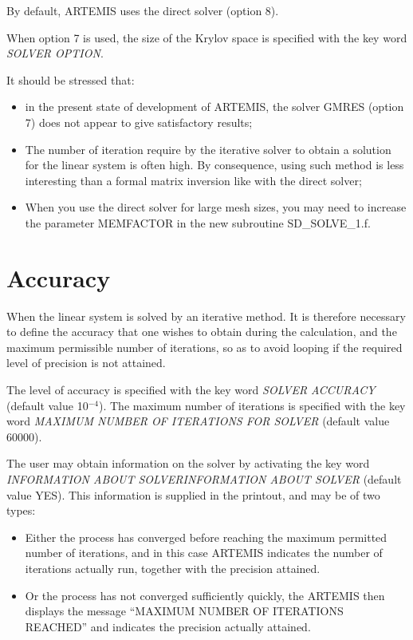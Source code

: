 By default, ARTEMIS uses the direct solver (option 8).

When option 7 is used, the size of the Krylov space is specified with the key word \textit{SOLVER OPTION}.

It should be stressed that:

\begin{itemize}
\item  in the present state of development of ARTEMIS, the solver GMRES (option
  7) does not appear to give satisfactory results;

\item  The number of iteration require by the iterative solver to obtain a
  solution for the linear system is often high. By consequence, using such
    method is less interesting than a formal matrix inversion like with the
    direct solver;

\item  When you use the direct solver for large mesh sizes, you may need to
  increase the parameter MEMFACTOR in the new subroutine SD\_SOLVE\_1.f.
\end{itemize}


\section{Accuracy}

When the linear system is solved by an iterative method. It is therefore
necessary to define the accuracy that one wishes to obtain during the
calculation, and the maximum permissible number of iterations, so as to avoid
looping if the required level of precision is not attained.

The level of accuracy is specified with the key word \textit{SOLVER ACCURACY}
(default value 10${}^{-4}$). The maximum number of iterations is specified with
the key word \textit{MAXIMUM NUMBER OF ITERATIONS FOR SOLVER} (default value
60000).

The user may obtain information on the solver by activating the key word
\textit{INFORMATION ABOUT SOLVERINFORMATION ABOUT SOLVER} (default value YES).
This information is supplied in the printout, and may be of two types:

\begin{itemize}
\item  Either the process has converged before reaching the maximum permitted
  number of iterations, and in this case ARTEMIS indicates the number of
    iterations actually run, together with the precision attained.

\item  Or the process has not converged sufficiently quickly, the ARTEMIS then
  displays the message ``MAXIMUM NUMBER OF ITERATIONS REACHED'' and indicates
    the precision actually attained.
\end{itemize}



